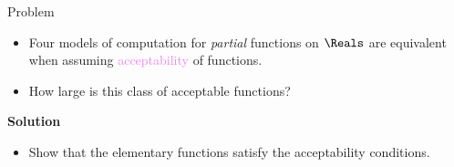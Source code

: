 \begin{frame}{Problem}
    \begin{itemize}
        \pause \item Four models of computation for \textit{partial} functions on $\Reals$ are equivalent when assuming \textcolor{violet}{acceptability} of functions. 
        \pause \item How large is this class of acceptable functions?
    \end{itemize}
\pause \textbf{\textcolor{OliveGreen}{Solution}}\\
    \begin{itemize}
        \pause \item Show that the elementary functions satisfy the acceptability conditions. 
    \end{itemize}
    
\end{frame}

